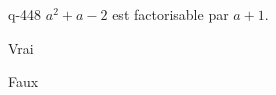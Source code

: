 \begin{truefalse}{q-448}
$a^2+a-2$ est factorisable par $a+1$.
\item Vrai
\item* Faux
\end{truefalse}

